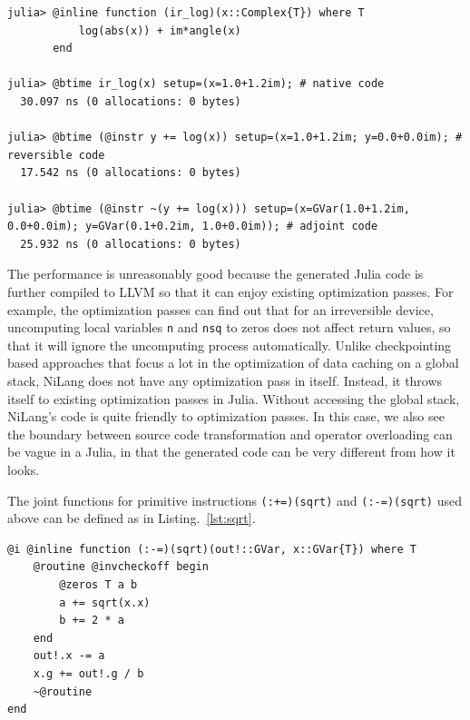 \documentclass{article}
\newcommand{\<}{\langle}
\renewcommand{\>}{\rangle}
\newcommand{\Lst}[1]{Listing.~\ref{#1}}
\theoremstyle{definition}\newtheorem{definition}{\textit{Definition}}
\begin{document}
\begin{minipage}{.88\textwidth}
\begin{lstlisting}[mathescape=true,caption={Time and allocation to differentiate complex valued log.},label={lst:time-complex}, frame=tlrb]
julia> @inline function (ir_log)(x::Complex{T}) where T
           log(abs(x)) + im*angle(x)
       end

julia> @btime ir_log(x) setup=(x=1.0+1.2im); # native code
  30.097 ns (0 allocations: 0 bytes)

julia> @btime (@instr y += log(x)) setup=(x=1.0+1.2im; y=0.0+0.0im); # reversible code
  17.542 ns (0 allocations: 0 bytes)

julia> @btime (@instr ~(y += log(x))) setup=(x=GVar(1.0+1.2im, 0.0+0.0im); y=GVar(0.1+0.2im, 1.0+0.0im)); # adjoint code
  25.932 ns (0 allocations: 0 bytes)
\end{lstlisting}
\end{minipage}

The performance is unreasonably good because the generated Julia code is further compiled to LLVM so that it can enjoy existing optimization passes.
For example, the optimization passes can find out that for an irreversible device, uncomputing local variables \texttt{n} and \texttt{nsq} to zeros does not affect return values, so that it will ignore the uncomputing process automatically.
Unlike checkpointing based approaches that focus a lot in the optimization of data caching on a global stack, NiLang does not have any optimization pass in itself.
Instead, it throws itself to existing optimization passes in Julia. Without accessing the global stack, NiLang's code is quite friendly to optimization passes.
In this case, we also see the boundary between source code transformation and operator overloading can be vague in a Julia, in that the generated code can be very different from how it looks.

The joint functions for primitive instructions \texttt{(:+=)(sqrt)} and \texttt{(:-=)(sqrt)} used above can be defined as in \Lst{lst:sqrt}.

\begin{minipage}{.88\textwidth}
    \begin{lstlisting}[mathescape=true,caption={Adjoints for primitives \texttt{(:+=)(sqrt)} and \texttt{(:-=)(sqrt)}.},label={lst:sqrt}, frame=tlrb]
@i @inline function (:-=)(sqrt)(out!::GVar, x::GVar{T}) where T
    @routine @invcheckoff begin
        @zeros T a b
        a += sqrt(x.x)
        b += 2 * a
    end
    out!.x -= a
    x.g += out!.g / b
    ~@routine
end
\end{lstlisting}
\end{minipage}
\end{document}
